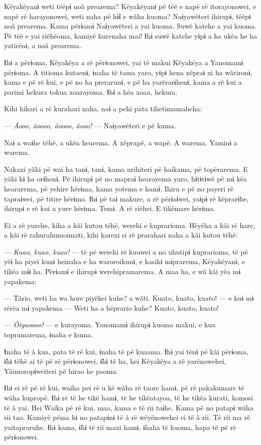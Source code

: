 Këyakëyanɨ weti tëëpɨ noã prearema? Këyakëyanɨ pë tëë e napë rë
itorayonowei, e napë rë harayonowei, weti naha pë hɨ̃ɨ e wãha kuoma?
Naɨyawëteri ihirupɨ, tëëpɨ noã prearema. Kama përɨamɨ Naɨyawëteri a yai
kuoma. Suwë katehe a yai kuoma. Pë tëë e yai riëhëoma, kamiyë kurenaha
mai! Ɨhɨ suwë katehe yɨpɨ a ha ukëa he ha yatirënɨ, a noã prearema. 

Ɨhɨ a përɨoma, Këyakëya a rë përɨonowei, yai të makui Këyakëya a
Yanomamɨ përɨoma. A titioma kutaenɨ, ɨnaha të tama yaro, yɨpɨ hena
xëpraɨ xi ha wãrironɨ, kama e pë rë kui, e pë no ha prerarunɨ, e pë ha
yarërarɨhenɨ, kama a rë kui a parimi hekura tokua xoarayoma. Ɨhɨ a hëa
xoaa, hekura. 

Kihi hikari a rë kurahari naha, naɨ a pehi pata tihetimamaheha:

--- \textit{Ãooo, ãoooo, ãoooo, ãooo!} --- Naɨyawëteri e pë kuma. 

Naɨ a waɨhe tëhë, a ukëa hearema. A xëprapë, a wapë. A warema. Yaminɨ a
warema. 

Nakaxi yãhi pë wai ha tanɨ, tanɨ, kama urihiteri pë haikama, pë
 topërarema. E yãhi kɨ ha orɨhenɨ. Pë ihirupɨ pë no mapraɨ hearayoma
 yaro, hɨtɨtɨwë pë mɨ këa heararema, pë yehire hërɨma, kama yotema e
 hamɨ. Ihiru e pë no payeri rë tapraɨwei, pë titire hërɨma. Ɨhɨ pë taɨ
 makure, a rë përɨaɨwei, yaɨpɨ rë këprarɨhe, ihirupɨ e rë kui a yure
 hërɨma. Temɨ. A rë riëhei. E tikëmare hërɨma. 

Ei a rë yurehe, kiha a kãi kutou tëhë, werehi e kuprarioma. Hëyëha a kãi
rë hare, a kãi rë rahurahumoimati, kihi karexi si rë prarahari naha a
kãi kutou tëhë: 

--- \textit{Kuao, kuao, kuao!} --- të pë werehi rë kuuwei a no uhutipɨ
kuprarioma, të pë yëɨ ha piyei kunɨ heinaha e ha waroroikunɨ, e kasikɨ
mɨprarema, Këyakëyanɨ, e tikëa mɨɨ ha. Përɨamɨ e ihirupɨ
werehipramarema. A maa ha, e wã kãi yëa mɨ yapakema: 

--- Tãrio, weti ha wa hore piyëkei kuhe? a wãti. Kuato, kuato, kuato!
--- e kuɨ mɨ rërëa mɨ yapakema --- Weti ha a hëprario kuhe? Kuato,
kuato, kuato! 

--- \textit{Õiyaoooo!} --- e kurayoma. Yanomamɨ ihirupɨ kuoma makui, e kua
topramarema, ɨnaha e kuma. 

Ɨnaha të ã kua, pata të rë kui, ɨnaha të pë kuaama. Ɨhɨ yai tënɨ pë kãi
 përɨoma, ɨ̃hɨ tëhë ai të pë rë përɨonowei, ɨ̃hɨ të ha, hei Këyakëya a rë
 yarënowehei, Yãimoropɨweiteri pë hirao he paoma.

Ɨhɨ ei rë pë rë kui, waiha pei rë u kë wãha rë taore hamɨ, pë rë
 pakakumare të wãha kupropë. Ɨhɨ rë të he tikë hamɨ, të he tikëatayoa, të
 he tikëa kurati, komosi të ã yai. Hei Waika pë rë kui, maa, kama e të
 rii taɨhe. Kama pë no patapɨ wãha rii tao. Kamiyë pëma kɨ no patapɨnɨ të
 ã rë wëyënowehei ei të ã rii. Të rii ma rë yaitapraruhe. Ɨhɨ kama, ɨ̃hɨ
 të rii maxi hamɨ, ɨ̃naha të kuoma, hapa të pë rë përɨonowei. 

